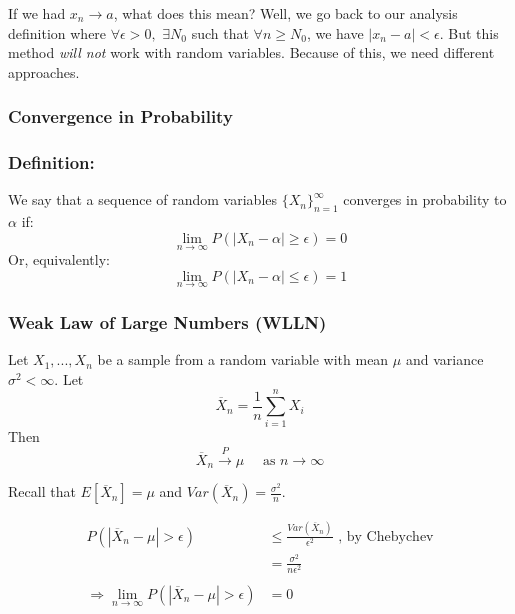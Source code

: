 \documentclass{article}
\begin{document}
\noindent If we had $x_n\to a$, what does this mean? Well, we go back to our analysis definition where $\forall \epsilon > 0,$ $\exists N_0$ such that $\forall n \geq N_0$, we have $|x_n - a| < \epsilon$. But this method \textit{will not} work with random variables. Because of this, we need different approaches.

\subsubsection{Convergence in Probability}
\subsubsection*{Definition:}
We say that a sequence of random variables $\{X_n\}_{n=1}^\infty$ converges in probability to $\alpha$ if:
\begin{equation*}
    \lim_{n\to\infty} P(|X_n - \alpha| \geq \epsilon) = 0
\end{equation*}
Or, equivalently:
\begin{equation*}
    \lim_{n\to\infty} P(|X_n - \alpha| \leq \epsilon) = 1
\end{equation*}

\subsubsection{Weak Law of Large Numbers (WLLN)}
Let $X_1,...,X_n$ be a sample from a random variable with mean $\mu$ and variance $\sigma^2<\infty$. Let
\begin{equation}
    \overline{X}_n = \frac{1}{n}\sum_{i=1}^n X_i
\end{equation}
Then
\begin{equation*}
    \overline{X}_n \xrightarrow{P} \mu \quad \text{ as } n\to\infty
\end{equation*}

Recall that $E[\overline{X}_n] = \mu$ and $Var(\overline{X}_n) = \frac{\sigma^2}{n}$.

\begin{equation*}
\begin{split}
    P\left( |\overline{X}_n - \mu| > \epsilon \right) &\leq \frac{Var(\overline{X}_n)}{\epsilon^2}\text{ , by Chebychev}\\
        &= \frac{\sigma^2}{n\epsilon^2}\\
        \\
        \Rightarrow \lim_{n\to\infty} P(|\overline{X}_n - \mu| > \epsilon) &= 0
\end{split}
\end{equation*}
\end{document}
